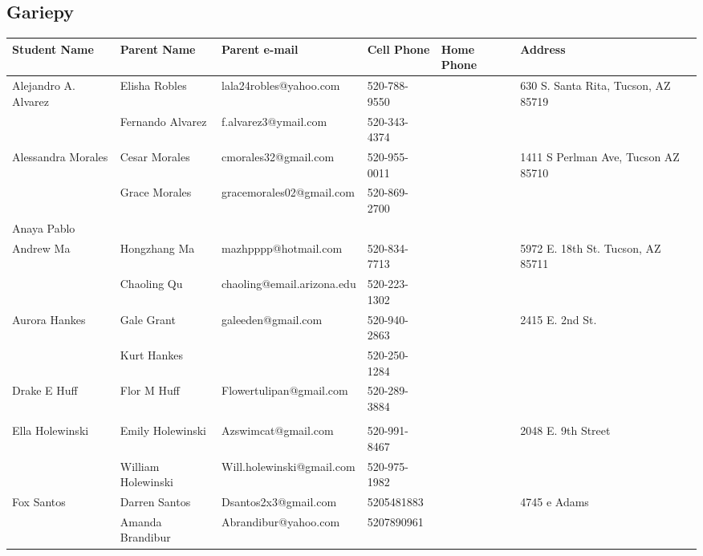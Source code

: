 \documentclass[landscape]{article}\usepackage[]{graphicx}\usepackage[]{color}
\begin{document}
\subsection{Gariepy}
\begin{longtable}{|p{100pt}|p{100pt}|p{140pt}|p{60pt}|p{64pt}|p{120pt}|}
\textbf{Student Name} & \textbf{Parent Name} & \textbf{Parent e-mail} & \textbf{Cell Phone} & \textbf{Home Phone} & \textbf{Address}\\
\hline
\hline
\multirow{2}{100pt}{Alejandro A. Alvarez} & Elisha Robles & lala24robles@yahoo.com & 520-788-9550 &  & \multirow{2}{120pt}{630 S. Santa Rita, Tucson, AZ 85719} \\
 & Fernando Alvarez & f.alvarez3@ymail.com & 520-343-4374 &  & \\
\hline
\multirow{2}{100pt}{Alessandra Morales} & Cesar Morales  & cmorales32@gmail.com & 520-955-0011 &  & \multirow{2}{120pt}{1411 S Perlman Ave, Tucson AZ 85710} \\
 & Grace Morales & gracemorales02@gmail.com & 520-869-2700 &  & \\
\hline
\multirow{2}{100pt}{Anaya Pablo} &  &  &  &  & \multirow{2}{120pt}{} \\
 &  &  &  &  & \\
\hline
\multirow{2}{100pt}{Andrew Ma} & Hongzhang Ma & mazhpppp@hotmail.com & 520-834-7713 &  & \multirow{2}{120pt}{5972 E. 18th St. Tucson, AZ 85711} \\
 & Chaoling Qu & chaoling@email.arizona.edu & 520-223-1302 &  & \\
\hline
\multirow{2}{100pt}{Aurora Hankes} & Gale Grant & galeeden@gmail.com & 520-940-2863 &  & \multirow{2}{120pt}{2415 E. 2nd St.} \\
 & Kurt Hankes &  & 520-250-1284 &  & \\
\hline
\multirow{2}{100pt}{Drake E Huff} & Flor M Huff & Flowertulipan@gmail.com & 520-289-3884 &  & \multirow{2}{120pt}{} \\
 &  &  &  &  & \\
\hline
\multirow{2}{100pt}{Ella Holewinski} & Emily Holewinski & Azswimcat@gmail.com & 520-991-8467 &  & \multirow{2}{120pt}{2048 E. 9th Street} \\
 & William Holewinski & Will.holewinski@gmail.com & 520-975-1982 &  & \\
\hline
\multirow{2}{100pt}{Fox Santos} & Darren Santos & Dsantos2x3@gmail.com & 5205481883 &  & \multirow{2}{120pt}{4745 e Adams} \\
 & Amanda Brandibur & Abrandibur@yahoo.com & 5207890961 &  & \\

\end{longtable}
\end{document}
